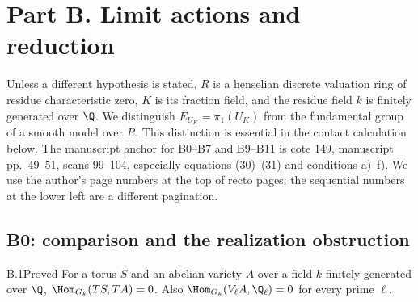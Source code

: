 \section{Part B. Limit actions and reduction}
\label{sec:B}

Unless a different hypothesis is stated, $R$ is a henselian discrete valuation
ring of residue characteristic zero, $K$ is its fraction field, and the residue
field $k$ is finitely generated over $\Q$. We distinguish
$E_{U_K}=\pi_1(U_K)$ from the fundamental group of a smooth model over $R$.
This distinction is essential in the contact calculation below.
The manuscript anchor for B0--B7 and B9--B11 is cote 149, manuscript
pp.~49--51, scans 99--104, especially equations (30)--(31) and conditions
a)--f). We use the author's page numbers at the top of recto pages; the
sequential numbers at the lower left are a different pagination.

\subsection{B0: comparison and the realization obstruction}

\begin{claim}{B.1}{Proved}
For a torus $S$ and an abelian variety $A$ over a field $k$ finitely generated
over $\Q$, $\Hom_{G_k}(TS,TA)=0$. Also
$\Hom_{G_k}(V_\ell A,\Q_\ell)=0$ for every prime $\ell$.
\end{claim}


